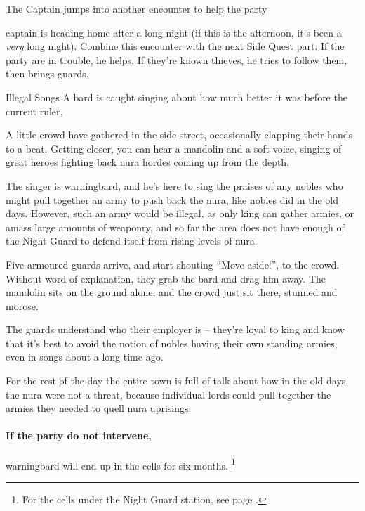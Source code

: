 \begin{multicols}{2}
{The Captain}%
{ jumps into another encounter to help the party}%

\captain

\Gls{captain} is heading home after a long night (if this is the afternoon, it's been a \emph{very} long night).
Combine this encounter with the next Side Quest part.
If the party are in trouble, he helps.
If they're known thieves, he tries to follow them, then brings guards.

{Illegal Songs}%
{A bard is caught singing about how much better it was before the current ruler, }%

\begin{boxtext}
	A little crowd have gathered in the side street, occasionally clapping their hands to a beat.
	Getting closer, you can hear a mandolin and a soft voice, singing of great heroes fighting back nura hordes coming up from the depth.
\end{boxtext}

The singer is \gls{warningbard}, and he's here to sing the praises of any nobles who might pull together an army to push back the nura, like nobles did in the old days.  However, such an army would be illegal, as only \gls{king} can gather armies, or amass large amounts of weaponry, and so far the area does not have enough of the Night Guard to defend itself from rising levels of nura.

\begin{boxtext}

	Five armoured guards arrive, and start shouting ``Move aside!'', to the crowd.  Without word of explanation, they grab the bard and drag him away.  The mandolin sits on the ground alone, and the crowd just sit there, stunned and morose.

\end{boxtext}

The guards understand who their employer is -- they're loyal to \gls{king} and know that it's best to avoid the notion of nobles having their own standing armies, even in songs about a long time ago.

For the rest of the day the entire town is full of talk about how in the old days, the nura were not a threat, because individual lords could pull together the armies they needed to quell nura uprisings.

\paragraph{If the party do not intervene,}
\gls{warningbard} will end up in the cells for six months.
\footnote{For the cells under the Night Guard station, see page \pageref{guardstation}.}


\end{multicols}
